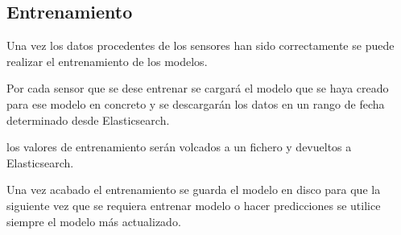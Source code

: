 \begin{comment}
Estos componentes se pueden activar o desactivar a la hora de crear el modelo.

Parámetros:
\begin{itemize}
    \item \textbf{p}:
    \item \textbf{d}:
    \item \textbf{q}:
    \item \textbf{m}:
    \item \textbf{sp}:
    \item \textbf{sd}:
    \item \textbf{pq}:
    \item \textbf{regressor}:
\end{itemize}

\begin{verbatim}
   def _inicializar(self):

        extract_features = compose.TransformerUnion(
            Modelo._get_ordinal_date,
        )

        model = (
            extract_features |
            time_series.SNARIMAX(
                p=self.p,
                d=self.d,
                q=self.q,
                m=self.m,
                sp=self.sp,
                sq=self.sq,
                regressor=(
                    preprocessing.StandardScaler() |
                    linear_model.LinearRegression(
                        intercept_init= self.intercept_init,
                        optimizer=optim.SGD(self.sgd),
                        intercept_lr= self.intercerpt_lr
                    )
                )
            )
        )

        return model
\end{verbatim}
\end{comment}
\subsection{Entrenamiento}

Una vez los datos procedentes de los sensores han sido correctamente se puede realizar el entrenamiento de los modelos.

Por cada sensor que se dese entrenar se cargará el modelo que se haya creado para ese modelo en concreto y se descargarán los datos en un rango de fecha determinado desde Elasticsearch.

los valores de entrenamiento serán volcados a un fichero y devueltos a Elasticsearch.

Una vez acabado el entrenamiento se guarda el modelo en disco para que la siguiente vez que se requiera entrenar modelo o hacer predicciones se utilice siempre el modelo más actualizado.


